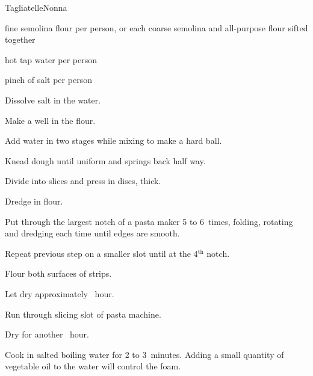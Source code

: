 \begin{recipe}{Tagliatelle}{Nonna}{}

\begin{ingredients}
\item {} fine semolina flour per person, or  each coarse semolina and all-purpose flour sifted together
\item {} hot tap water per person
\item pinch of salt per person
\end{ingredients}

\begin{directions}
\item Dissolve salt in the water.
\item Make a well in the flour.
\item Add water in two stages while mixing to make a hard ball.
\item Knead dough until uniform and springs back half way.
\item Divide into slices and press in  discs, \inch{\threequarter} thick.
\item Dredge in flour.
\item Put through the largest notch of a pasta maker 5 to 6~times, folding, rotating and dredging each time until edges are smooth.
\item Repeat previous step on a smaller slot until at the 4$^{\mathrm{th}}$ notch.
\item Flour both surfaces of strips.
\item Let dry approximately \half~hour.
\item Run through slicing slot of pasta machine.
\item Dry for another \half~hour.
\item Cook in salted boiling water for 2 to 3~minutes. Adding a small quantity of vegetable oil to the water will control the foam.
\end{directions}

\end{recipe}
